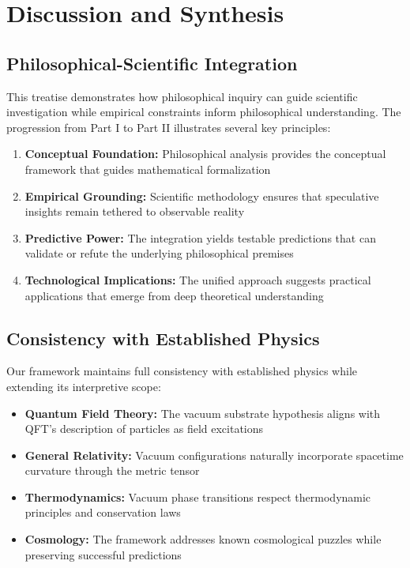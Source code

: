\documentclass[12pt,a4paper]{article}
\begin{document}
\section{Discussion and Synthesis}

\subsection{Philosophical-Scientific Integration}

This treatise demonstrates how philosophical inquiry can guide scientific investigation while empirical constraints inform philosophical understanding. The progression from Part I to Part II illustrates several key principles:

\begin{enumerate}
    \item \textbf{Conceptual Foundation:} Philosophical analysis provides the conceptual framework that guides mathematical formalization
    \item \textbf{Empirical Grounding:} Scientific methodology ensures that speculative insights remain tethered to observable reality
    \item \textbf{Predictive Power:} The integration yields testable predictions that can validate or refute the underlying philosophical premises
    \item \textbf{Technological Implications:} The unified approach suggests practical applications that emerge from deep theoretical understanding
\end{enumerate}

\subsection{Consistency with Established Physics}

Our framework maintains full consistency with established physics while extending its interpretive scope:

\begin{itemize}
    \item \textbf{Quantum Field Theory:} The vacuum substrate hypothesis aligns with QFT's description of particles as field excitations
    \item \textbf{General Relativity:} Vacuum configurations naturally incorporate spacetime curvature through the metric tensor
    \item \textbf{Thermodynamics:} Vacuum phase transitions respect thermodynamic principles and conservation laws
    \item \textbf{Cosmology:} The framework addresses known cosmological puzzles while preserving successful predictions
\end{itemize}
\end{document}

